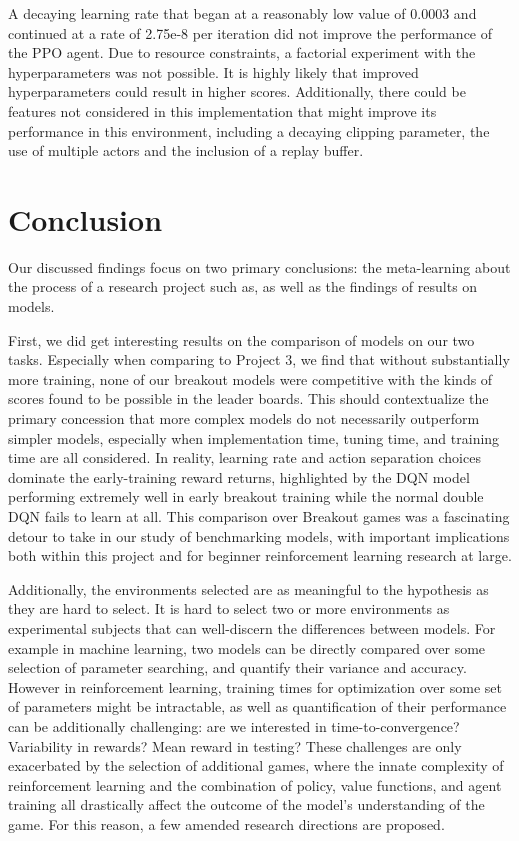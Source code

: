 \documentclass[conference]{IEEEtran}
\begin{document}
A decaying learning rate that began at a reasonably low value of 0.0003 and continued at a rate of 2.75e-8 per iteration did not improve the performance of the PPO agent. Due to resource constraints, a factorial experiment with the hyperparameters was not possible. It is highly likely that improved hyperparameters could result in higher scores. Additionally, there could be features not considered in this implementation that might improve its performance in this environment, including a decaying clipping parameter, the use of multiple actors and the inclusion of a replay buffer.

\section{Conclusion} \label{conclusion}
Our discussed findings focus on two primary conclusions: the meta-learning about the process of a research project such as, as well as the findings of results on models.

First, we did get interesting results on the comparison of models on our two tasks. Especially when comparing to Project 3, we find that without substantially more training, none of our breakout models were competitive with the kinds of scores found to be possible in the leader boards. This should contextualize the primary concession that more complex models do not necessarily outperform simpler models, especially when implementation time, tuning time, and training time are all considered. In reality, learning rate and action separation choices dominate the early-training reward returns, highlighted by the DQN model performing extremely well in early breakout training while the normal double DQN fails to learn at all. This comparison over Breakout games was a fascinating detour to take in our study of benchmarking models, with important implications both within this project and for beginner reinforcement learning research at large.

Additionally, the environments selected are as meaningful to the hypothesis as they are hard to select. It is hard to select two or more environments as experimental subjects that can well-discern the differences between models. For example in machine learning, two models can be directly compared over some selection of parameter searching, and quantify their variance and accuracy. However in reinforcement learning, training times for optimization over some set of parameters might be intractable, as well as quantification of their performance can be additionally challenging: are we interested in time-to-convergence? Variability in rewards? Mean reward in testing? These challenges are only exacerbated by the selection of additional games, where the innate complexity of reinforcement learning and the combination of policy, value functions, and agent training all drastically affect the outcome of the model's understanding of the game. For this reason, a few amended research directions are proposed.
\end{document}
